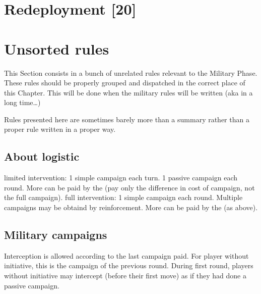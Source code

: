 \section{Redeployment [20]}

\section{Unsorted rules}
\begin{designnote}
  This Section consists in a bunch of unrelated rules relevant to the Military
  Phase. These rules should be properly grouped and dispatched in the correct
  place of this Chapter. This will be done when the military rules will be
  written (aka in a long time\ldots)

  Rules presented here are sometimes barely more than a summary rather than a
  proper rule written in a proper way.
\end{designnote}

\subsection{About logistic}

\bparag limited intervention: 1 simple campaign each turn. 1 passive campaign
each round. More can be paid by the \MAJ (pay only the difference in cost of
campaign, not the full campaign).
\bparag full intervention: 1 simple campaign each round. Multiple campaigns
may be obtaind by reinforcement. More can be paid by the \MAJ (as above).


\subsection{Military campaigns}
\aparag Interception is allowed according to the last campaign paid.
\bparag For player without initiative, this is the campaign of the previous
round.
\bparag During first round, players without initiative may intercept (before
their first move) as if they had done a passive campaign.

